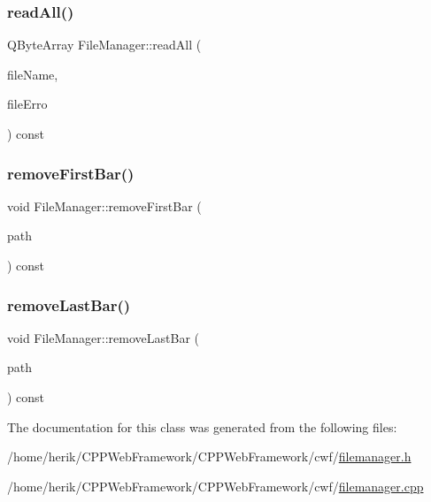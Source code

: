 \mbox{\label{class_file_manager_a2f00c43fed6befb1136502c6db2f7dee}} 
\subsubsection{\texorpdfstring{read\+All()}{readAll()}}
{\footnotesize\ttfamily Q\+Byte\+Array File\+Manager\+::read\+All (\begin{DoxyParamCaption}\item[{const Q\+String \&}]{file\+Name,  }\item[{Q\+File\+Device\+::\+File\+Error \&}]{file\+Erro }\end{DoxyParamCaption}) const}

\mbox{\label{class_file_manager_a79f0d0e4d4528d0f98496c84a43ff06b}} 
\subsubsection{\texorpdfstring{remove\+First\+Bar()}{removeFirstBar()}}
{\footnotesize\ttfamily void File\+Manager\+::remove\+First\+Bar (\begin{DoxyParamCaption}\item[{Q\+String \&}]{path }\end{DoxyParamCaption}) const}

\mbox{\label{class_file_manager_abebe8f302627b2e8db0bf911487bd04d}} 
\subsubsection{\texorpdfstring{remove\+Last\+Bar()}{removeLastBar()}}
{\footnotesize\ttfamily void File\+Manager\+::remove\+Last\+Bar (\begin{DoxyParamCaption}\item[{Q\+String \&}]{path }\end{DoxyParamCaption}) const}



The documentation for this class was generated from the following files\+:\begin{DoxyCompactItemize}
\item 
/home/herik/\+C\+P\+P\+Web\+Framework/\+C\+P\+P\+Web\+Framework/cwf/\hyperlink{filemanager_8h}{filemanager.\+h}\item 
/home/herik/\+C\+P\+P\+Web\+Framework/\+C\+P\+P\+Web\+Framework/cwf/\hyperlink{filemanager_8cpp}{filemanager.\+cpp}\end{DoxyCompactItemize}
